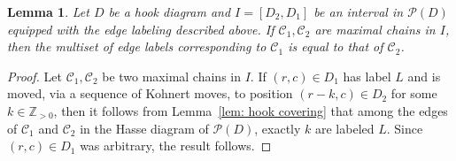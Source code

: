 \documentclass[letterpaper,10pt]{article}
\newtheorem{lemma}[theorem]{Lemma}
\newtheorem{remark}[theorem]{Remark}
\newcommand{\rn}[1]{{\color{red} #1}}
\newcommand{\ldownarrow}{\Big\downarrow}
\begin{document}






\begin{lemma}\label{lem: hook multiset} Let $D$ be a hook diagram and $I=[D_2,D_1]$ be an interval in $\mathcal{P}(D)$ equipped with the edge labeling described above. If $\mathcal{C}_1,\mathcal{C}_2$ are maximal chains in $I$, then the multiset of edge labels corresponding to $\mathcal{C}_1$ is equal to that of $\mathcal{C}_2$.
\end{lemma}
\begin{proof}

Let $\mathcal{C}_1,\mathcal{C}_2$ be two maximal chains in $I$. If $(r,c)\in D_1$ has label $L$ and is moved, via a sequence of Kohnert moves, to position $(r-k,c)\in D_2$ for some $k\in\mathbb{Z}_{>0}$, then it follows from Lemma~\ref{lem: hook covering} that among the edges of $\mathcal{C}_1$ and $\mathcal{C}_2$ in the Hasse diagram of $\mathcal{P}(D)$, exactly $k$ are labeled $L$. Since $(r,c)\in D_1$ was arbitrary, the result follows.
\end{proof}
\end{document}

